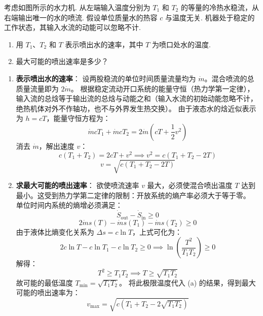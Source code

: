 \begin{exercise}\label{ex:12.7}
考虑如图所示的水力机. 从左端输入温度分别为 $T_1$ 和 $T_2$ 的等量的冷热水稳流，从右端输出唯一的水的喷流. 假设单位质量水的热容 $c$ 与温度无关. 机器处于稳定的工作状态，其输入水流的动能可以忽略不计. 
\begin{enumerate}
  \item[(a)] 用 $T_1$、$T_2$ 和 $T$ 表示喷出水的速率，其中 $T$ 为喷口处水的温度.
  \item[(b)] 最大可能的喷出速率是多少？
\end{enumerate}
\begin{center}
\end{center}
\end{exercise}
\begin{solution}
\begin{enumerate}
    \item[(a)] \textbf{表示喷出水的速率}：
    设两股稳流的单位时间质量流量均为 $\dot{m}$。混合喷流的总质量流量即为 $2\dot{m}$。
    根据稳定流动开口系统的能量守恒（热力学第一定律），输入流的总焓等于输出流的总焓与动能之和（输入水流的初始动能忽略不计，绝热机体对外不作轴功，也不与外界发生热交换）。
    由于液态水的焓近似表示为 $h = cT$，能量守恒方程为：
    $$ \dot{m} c T_1 + \dot{m} c T_2 = 2\dot{m} \left( cT + \frac{1}{2}v^2 \right) $$
    消去 $\dot{m}$，解出速度 $v$：
    $$ c(T_1 + T_2) = 2cT + v^2 \implies v^2 = c(T_1 + T_2 - 2T) $$
    $$ v = \sqrt{c(T_1 + T_2 - 2T)} $$

    \item[(b)] \textbf{求最大可能的喷出速率}：
    欲使喷流速率 $v$ 最大，必须使混合喷出温度 $T$ 达到最小。这受到热力学第二定律的限制：开放系统的熵产率必须大于等于零。
    单位时间内系统的熵增必须满足：
    $$ \dot{S}_{\mathrm{out}} - \dot{S}_{\mathrm{in}} \ge 0 $$
    $$ 2\dot{m} s(T) - \dot{m} s(T_1) - \dot{m} s(T_2) \ge 0 $$
    由于液体比熵变化关系为 $\Delta s = c \ln T$，上式可化为：
    $$ 2 c \ln T - c \ln T_1 - c \ln T_2 \ge 0 \implies \ln \left( \frac{T^2}{T_1 T_2} \right) \ge 0 $$
    解得：
    $$ T^2 \ge T_1 T_2 \implies T \ge \sqrt{T_1 T_2} $$
    故可能的最低温度 $T_{\min} = \sqrt{T_1 T_2}$。
    将此极限温度代入 (a) 的结果，得到最大可能的喷出速率为：
    $$ v_{\max} = \sqrt{c(T_1 + T_2 - 2\sqrt{T_1 T_2})} $$
\end{enumerate}
\end{solution}

